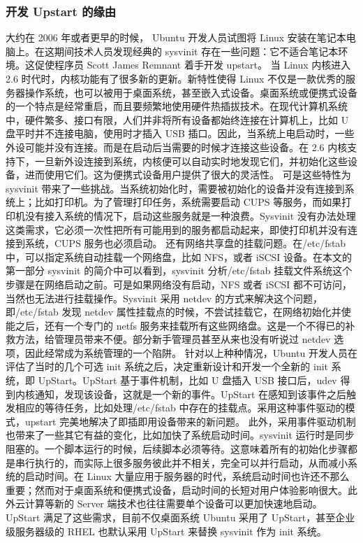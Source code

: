 \documentclass[a4paper,10pt,english]{sphinxmanual}
\begin{document}
\subsubsection{开发 Upstart 的缘由}
\label{\detokenize{linux/point:upstart}}
大约在 2006 年或者更早的时候， Ubuntu 开发人员试图将 Linux 安装在笔记本电脑上。在这期间技术人员发现经典的 sysvinit 存在一些问题：它不适合笔记本环境。这促使程序员 Scott James Remnant 着手开发 upstart。
当 Linux 内核进入 2.6 时代时，内核功能有了很多新的更新。新特性使得 Linux 不仅是一款优秀的服务器操作系统，也可以被用于桌面系统，甚至嵌入式设备。桌面系统或便携式设备的一个特点是经常重启，而且要频繁地使用硬件热插拔技术。在现代计算机系统中，硬件繁多、接口有限，人们并非将所有设备都始终连接在计算机上，比如 U 盘平时并不连接电脑，使用时才插入 USB 插口。因此，当系统上电启动时，一些外设可能并没有连接。而是在启动后当需要的时候才连接这些设备。在 2.6 内核支持下，一旦新外设连接到系统，内核便可以自动实时地发现它们，并初始化这些设备，进而使用它们。这为便携式设备用户提供了很大的灵活性。
可是这些特性为 sysvinit 带来了一些挑战。当系统初始化时，需要被初始化的设备并没有连接到系统上；比如打印机。为了管理打印任务，系统需要启动 CUPS 等服务，而如果打印机没有接入系统的情况下，启动这些服务就是一种浪费。Sysvinit 没有办法处理这类需求，它必须一次性把所有可能用到的服务都启动起来，即使打印机并没有连接到系统，CUPS 服务也必须启动。
还有网络共享盘的挂载问题。在/etc/fstab 中，可以指定系统自动挂载一个网络盘，比如 NFS，或者 iSCSI 设备。在本文的第一部分 sysvinit 的简介中可以看到，sysvinit 分析/etc/fstab 挂载文件系统这个步骤是在网络启动之前。可是如果网络没有启动，NFS 或者 iSCSI 都不可访问，当然也无法进行挂载操作。Sysvinit 采用 netdev 的方式来解决这个问题，即/etc/fstab 发现 netdev 属性挂载点的时候，不尝试挂载它，在网络初始化并使能之后，还有一个专门的 netfs 服务来挂载所有这些网络盘。这是一个不得已的补救方法，给管理员带来不便。部分新手管理员甚至从来也没有听说过 netdev 选项，因此经常成为系统管理的一个陷阱。
针对以上种种情况，Ubuntu 开发人员在评估了当时的几个可选 init 系统之后，决定重新设计和开发一个全新的 init 系统，即 UpStart。UpStart 基于事件机制，比如 U 盘插入 USB 接口后，udev 得到内核通知，发现该设备，这就是一个新的事件。UpStart 在感知到该事件之后触发相应的等待任务，比如处理/etc/fstab 中存在的挂载点。采用这种事件驱动的模式，upstart 完美地解决了即插即用设备带来的新问题。
此外，采用事件驱动机制也带来了一些其它有益的变化，比如加快了系统启动时间。sysvinit 运行时是同步阻塞的。一个脚本运行的时候，后续脚本必须等待。这意味着所有的初始化步骤都是串行执行的，而实际上很多服务彼此并不相关，完全可以并行启动，从而减小系统的启动时间。在 Linux 大量应用于服务器的时代，系统启动时间也许还不那么重要；然而对于桌面系统和便携式设备，启动时间的长短对用户体验影响很大。此外云计算等新的 Server 端技术也往往需要单个设备可以更加快速地启动。
UpStart 满足了这些需求，目前不仅桌面系统 Ubuntu 采用了 UpStart，甚至企业级服务器级的 RHEL 也默认采用 UpStart 来替换 sysvinit 作为 init 系统。
\end{document}
